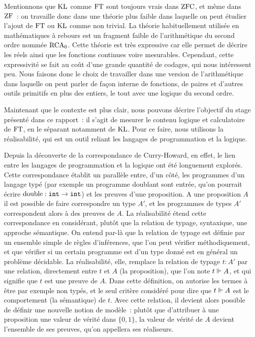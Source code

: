 \documentclass{article}
\begin{document}
Mentionnons que $\mathrm{KL}$ comme $\mathrm{FT}$ sont toujours vrais dans $\mathrm{ZFC}$, et même dans $\mathrm{ZF}$~: on travaille donc dans une théorie plus faible dans laquelle on peut étudier l'ajout de $\mathrm{FT}$ ou $\mathrm{KL}$ comme non trivial. La théorie habituellement utilisée en mathématiques à rebours est un fragment faible de l'arithmétique du second ordre nommée $\mathrm{RCA}_0$. Cette théorie est très expressive car elle permet de décrire les réels ainsi que les fonctions continues voire mesurables. Cependant, cette expressivité se fait au coût d'une grande quantité de codages, qui nous intéressent peu. Nous faisons donc le choix de travailler dans une version de l'arithmétique dans laquelle on peut parler de façon interne de fonctions, de paires et d'autres outils primitifs en plus des entiers, le tout avec une logique du second ordre.

Maintenant que le contexte est plus clair, nous pouvons décrire l'objectif du stage présenté dans ce rapport~: il s'agit de mesurer le contenu logique et calculatoire de $\mathrm{FT}$, en le séparant notamment de $\mathrm{KL}$. Pour ce faire, nous utilisons la réalisabilité, qui est un outil reliant les langages de programmation et la logique.

Depuis la découverte de la correspondance de Curry-Howard, en effet, le lien entre les langages de programmation et la logique ont été longuement explorés. Cette correspondance établit un parallèle entre, d'un côté, les programmes d'un langage typé (par exemple un programme doublant sont entrée, qu'on pourrait écrire $\mathrm{double} : \texttt{int} \to \texttt{int}$) et les preuves d'une proposition. A une proposition $A$ il est possible de faire correspondre un type $A'$, et les programmes de types $A'$ correspondent alors à des preuves de $A$. La réalisabilité étend cette correspondance en considérant, plutôt que la relation de typage, syntaxique, une approche sémantique. On entend par-là que la relation de typage est définie par un ensemble simple de règles d'inférences, que l'on peut vérifier méthodiquement, et que vérifier si un certain programme est d'un type donné est en général un problème décidable. La réalisabilité, elle, remplace la relation de typage $t : A'$ par une relation, directement entre $t$ et $A$ (la proposition), que l'on note $t \Vdash A$, et qui signifie que $t$ est une preuve de $A$. Dans cette définition, on autorise les termes à être par exemple non typés, et le seul critère considéré pour dire que $t \Vdash A$ est le comportement (la sémantique) de $t$. Avec cette relation, il devient alors possible de définir une nouvelle notion de modèle~: plutôt que d'attribuer à une proposition une valeur de vérité dans $\{0,1\}$, la valeur de vérité de $A$ devient l'ensemble de ses preuves, qu'on appellera ses réaliseurs.
\end{document}
